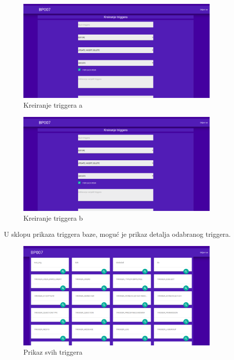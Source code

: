 \documentclass[12pt, a4paper]{report}
\theoremstyle{definition}
\begin{document}
\begin{figure}[H]
	\begin{center} 
		\includegraphics[width=0.9\textwidth]{a16.png}
	\end{center}
	\caption{Kreiranje triggera a}
\end{figure}
\begin{figure}[H]
	\begin{center} 
		\includegraphics[width=0.9\textwidth]{a16.png}
	\end{center}
	\caption{Kreiranje triggera b}
\end{figure}
\newpage
U sklopu prikaza triggera baze, moguć je prikaz detalja odabranog triggera.
\begin{figure}[H]
	\begin{center} 
		\includegraphics[width=0.9\textwidth]{a9.png}
	\end{center}
	\caption{Prikaz svih triggera}
\end{figure}
\end{document}
